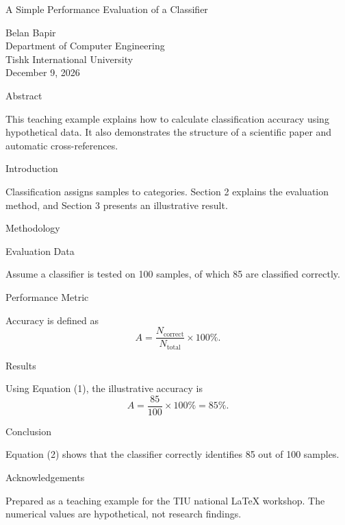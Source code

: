 \documentclass[11pt,a4paper]{article}
\begin{document}
A Simple Performance Evaluation of a Classifier

Belan Bapir\\
Department of Computer Engineering\\
Tishk International University\\
December 9, 2026

Abstract


This teaching example explains how to calculate classification accuracy using hypothetical data. It also demonstrates the structure of a scientific paper and automatic cross-references.


Introduction

Classification assigns samples to categories. Section 2 explains the evaluation method, and Section 3 presents an illustrative result.

Methodology


Evaluation Data

Assume a classifier is tested on 100 samples, of which 85 are classified correctly.

Performance Metric

Accuracy is defined as
\[
A=\frac{N_{\mathrm{correct}}}{N_{\mathrm{total}}}\times 100\% .
\]

Results

Using Equation (1), the illustrative accuracy is
\[
A=\frac{85}{100}\times 100\%=85\%.
\]

Conclusion

Equation (2) shows that the classifier correctly identifies 85 out of 100 samples.

Acknowledgements

Prepared as a teaching example for the TIU national LaTeX workshop. The numerical values are hypothetical, not research findings.
\end{document}
